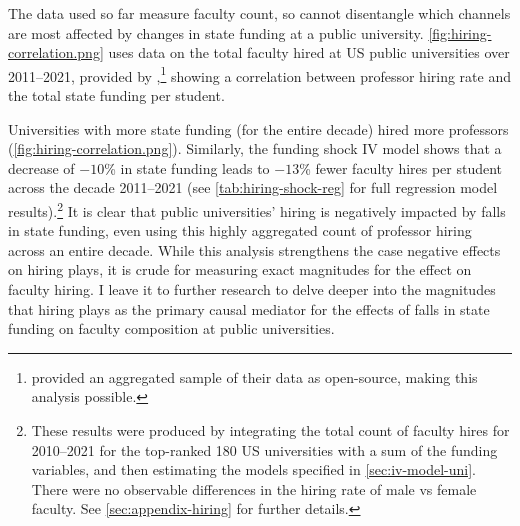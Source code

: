 The data used so far measure faculty count, so cannot disentangle which channels are most affected by changes in state funding at a public university.
\autoref{fig:hiring-correlation.png} uses data on the total faculty hired at US public universities over 2011--2021, provided by \cite{wapman2022quantifying},\footnote{
    \cite{wapman2022quantifying} provided an aggregated sample of their data as open-source, making this analysis possible.
} showing a correlation between professor hiring rate and the total state funding per student.

Universities with more state funding (for the entire decade) hired more professors (\autoref{fig:hiring-correlation.png}).
Similarly, the funding shock IV model shows that a decrease of $-10$\% in state funding leads to $-13$\% fewer faculty hires per student across the decade 2011--2021 (see \autoref{tab:hiring-shock-reg} for full regression model results).\footnote{
    These results were produced by integrating the total count of faculty hires for 2010--2021 for the top-ranked 180 US universities with a sum of the funding variables, and then estimating the models specified in \autoref{sec:iv-model-uni}.
    There were no observable differences in the hiring rate of male vs female faculty.
    See \autoref{sec:appendix-hiring} for further details.
}
It is clear that public universities' hiring is negatively impacted by falls in state funding, even using this highly aggregated count of professor hiring across an entire decade.
While this analysis strengthens the case negative effects on hiring plays, it is crude for measuring exact magnitudes for the effect on faculty hiring.
I leave it to further research to delve deeper into the magnitudes that hiring plays as the primary causal mediator for the effects of falls in state funding on faculty composition at public universities.
